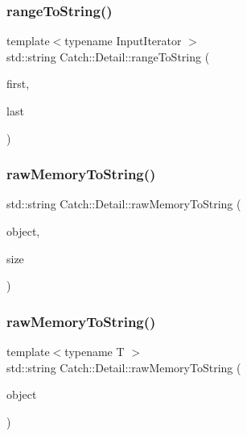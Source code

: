 \subsubsection{\texorpdfstring{range\+To\+String()}{rangeToString()}}
{\footnotesize\ttfamily template$<$typename Input\+Iterator $>$ \\
std\+::string Catch\+::\+Detail\+::range\+To\+String (\begin{DoxyParamCaption}\item[{Input\+Iterator}]{first,  }\item[{Input\+Iterator}]{last }\end{DoxyParamCaption})}

\mbox{\label{namespace_catch_1_1_detail_ac5d6c510e565ee5bddcc2236194ce29e}} 
\subsubsection{\texorpdfstring{raw\+Memory\+To\+String()}{rawMemoryToString()}\hspace{0.1cm}{\footnotesize\ttfamily [1/2]}}
{\footnotesize\ttfamily std\+::string Catch\+::\+Detail\+::raw\+Memory\+To\+String (\begin{DoxyParamCaption}\item[{const void $\ast$}]{object,  }\item[{std\+::size\+\_\+t}]{size }\end{DoxyParamCaption})}

\mbox{\label{namespace_catch_1_1_detail_a371620ed524abfcae5c3772bf49b563a}} 
\subsubsection{\texorpdfstring{raw\+Memory\+To\+String()}{rawMemoryToString()}\hspace{0.1cm}{\footnotesize\ttfamily [2/2]}}
{\footnotesize\ttfamily template$<$typename T $>$ \\
std\+::string Catch\+::\+Detail\+::raw\+Memory\+To\+String (\begin{DoxyParamCaption}\item[{const T \&}]{object }\end{DoxyParamCaption})}

